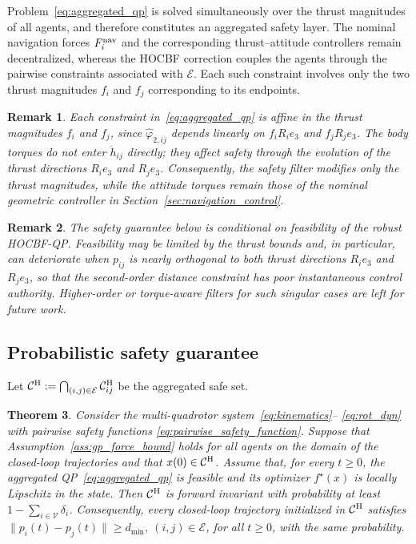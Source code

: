 \documentclass[journal,twoside,web]{ieeecolor}
\newtheorem{theorem}{Theorem}[section]
\newtheorem{remark}[theorem]{Remark}
\begin{document}
Problem~\eqref{eq:aggregated_qp} is solved simultaneously over the
thrust magnitudes of all agents, and therefore constitutes an
aggregated safety layer. The nominal navigation forces
$F_i^{\rm nav}$ and the corresponding thrust--attitude controllers
remain decentralized, whereas the HOCBF correction couples the
agents through the pairwise constraints associated with
$\mathcal E$. Each such constraint involves only the two thrust
magnitudes $f_i$ and $f_j$ corresponding to its endpoints.
\begin{remark}
Each constraint in~\eqref{eq:aggregated_qp} is affine in the thrust
magnitudes $f_i$ and $f_j$, since $\widehat\varphi_{2,ij}$ depends
linearly on $f_iR_ie_3$ and $f_jR_je_3$. The body torques do not
enter $\ddot h_{ij}$ directly; they affect safety through the
evolution of the thrust directions $R_ie_3$ and $R_je_3$.
Consequently, the safety filter modifies only the thrust magnitudes,
while the attitude torques remain those of the nominal geometric
controller in Section~\ref{sec:navigation_control}.
\end{remark}

\begin{remark}
The safety guarantee below is conditional on feasibility of
the robust HOCBF-QP. Feasibility may be limited by the thrust
bounds and, in particular, can deteriorate when $p_{ij}$ is
nearly orthogonal to both thrust directions $R_ie_3$ and
$R_je_3$, so that the second-order distance constraint has
poor instantaneous control authority. Higher-order or
torque-aware filters for such singular cases are left for
future work.
\end{remark}

\subsection{Probabilistic safety guarantee}
\label{subsec:probabilistic_safety}

Let $\mathcal C^{\rm H}
:=
\bigcap_{(i,j)\in\mathcal E}
\mathcal C_{ij}^{\rm H}$ be the aggregated safe set.


\begin{theorem}
\label{thm:probabilistic_safety}
Consider the multi-quadrotor system~\eqref{eq:kinematics}--%
\eqref{eq:rot_dyn} with pairwise safety functions
\eqref{eq:pairwise_safety_function}. Suppose that
Assumption~\ref{ass:gp_force_bound} holds for all agents on
the domain of the closed-loop trajectories and that
$x(0)\in\mathcal C^{\rm H}$. Assume that, for every
$t\geq0$, the aggregated QP~\eqref{eq:aggregated_qp} is
feasible and its optimizer $f^\star(x)$ is locally Lipschitz
in the state. Then $\mathcal C^{\rm H}$ is forward invariant
with probability at least $1-\sum_{i\in\mathcal V}\delta_i$. Consequently, every closed-loop trajectory initialized in
$\mathcal C^{\rm H}$ satisfies $\|p_i(t)-p_j(t)\|\geq d_{\min}$, $(i,j)\in\mathcal E$,
for all $t\geq0$, with the same probability.
\end{theorem}
\end{document}
